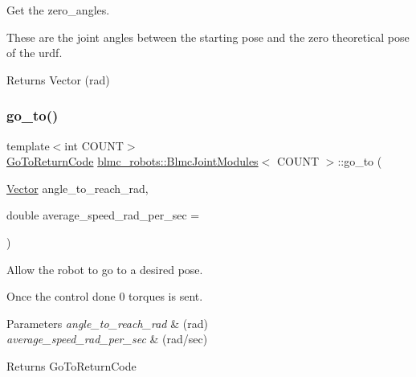 Get the zero\+\_\+angles. 

These are the joint angles between the starting pose and the zero theoretical pose of the urdf.

\begin{DoxyReturn}{Returns}
Vector (rad) 
\end{DoxyReturn}
\mbox{\label{classblmc__robots_1_1BlmcJointModules_afc82da986738d3a2265e5cf6337d3251}} 
\subsubsection{\texorpdfstring{go\+\_\+to()}{go\_to()}}
{\footnotesize\ttfamily template$<$int C\+O\+U\+NT$>$ \\
\hyperlink{blmc__joint__module_8hpp_ae2dd8b0230887c948d2583feb6beb051}{Go\+To\+Return\+Code} \hyperlink{classblmc__robots_1_1BlmcJointModules}{blmc\+\_\+robots\+::\+Blmc\+Joint\+Modules}$<$ C\+O\+U\+NT $>$\+::go\+\_\+to (\begin{DoxyParamCaption}\item[{\hyperlink{classblmc__robots_1_1BlmcJointModules_abaff382c6fd4b494ec0c17498d94919e}{Vector}}]{angle\+\_\+to\+\_\+reach\+\_\+rad,  }\item[{double}]{average\+\_\+speed\+\_\+rad\+\_\+per\+\_\+sec = {} }\end{DoxyParamCaption})\hspace{0.3cm}{\ttfamily [inline]}}



Allow the robot to go to a desired pose. 

Once the control done 0 torques is sent.


\begin{DoxyParams}{Parameters}
{\em angle\+\_\+to\+\_\+reach\+\_\+rad} & (rad) \\
\hline
{\em average\+\_\+speed\+\_\+rad\+\_\+per\+\_\+sec} & (rad/sec) \\
\hline
\end{DoxyParams}
\begin{DoxyReturn}{Returns}
Go\+To\+Return\+Code 
\end{DoxyReturn}
\mbox{\label{classblmc__robots_1_1BlmcJointModules_a97f538c52a1c00846497417333f93230}} 
